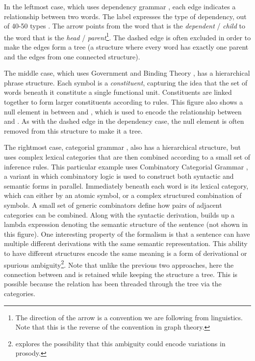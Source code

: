 In the leftmost case, which uses dependency grammar \parencite[\depgr;][]{dependency-grammar}, each edge indicates a relationship between two words.
The label expresses the type of dependency, out of 40-50 types \parencite{ud,sd}.
The arrow points from the word that is the \textit{dependent} / \textit{child} to the word that is the \textit{head} / \textit{parent}\footnote{The direction of the arrow is a convention we are following from linguistics. Note that this is the reverse of the convention in graph theory.}.
The dashed edge is often excluded in order to make the edges form a tree (a structure where every word has exactly one parent and the edges from one connected structure).

The middle case, which uses Government and Binding Theory \parencite[\gb;][]{gb}, has a hierarchical phrase structure.
Each symbol is a \textit{constituent}, capturing the idea that the set of words beneath it constitute a single functional unit.
Constituents are linked together to form larger constituents according to rules.
This figure also shows a null element in between  and , which is used to encode the relationship between  and .
As with the dashed edge in the dependency case, the null element is often removed from this structure to make it a tree.

The rightmost case, categorial grammar \parencite{categorial-grammar}, also has a hierarchical structure, but uses complex lexical categories that are then combined according to a small set of inference rules.
This particular example uses Combinatory Categorial Grammar \parencite[\ccg;][]{Steedman:2000}, a variant in which combinatory logic is used to construct both syntactic and semantic forms in parallel.
Immediately beneath each word is its lexical category, which can either by an atomic symbol, or a complex structured combination of symbols.
A small set of generic combinators define how pairs of adjacent categories can be combined.
Along with the syntactic derivation, \ccg builds up a lambda expression denoting the semantic structure of the sentence (not shown in this figure).
One interesting property of the formalism is that a sentence can have multiple different derivations with the same semantic representation.
This ability to have different structures encode the same meaning is a form of derivational or spurious ambiguity\footnote{\textcite{Steedman:2000} explores the possibility that this ambiguity could encode variations in prosody.}.
Note that unlike the previous two approaches, here the connection between  and  is retained while keeping the structure a tree.
This is possible because the relation has been threaded through the tree via the categories.

